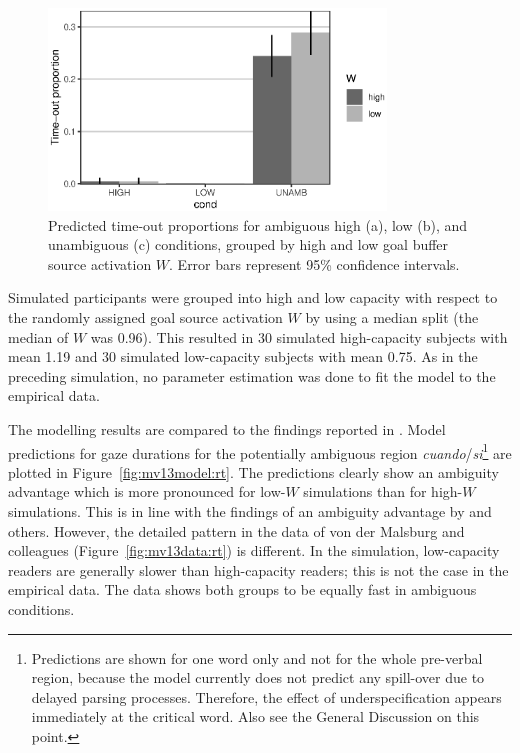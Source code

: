 \documentclass{cambridge7A}\usepackage[]{graphicx}\usepackage[]{color}
\newenvironment{knitrout}{}{} %
\begin{document}
\begin{figure}[!htbp]
  \centering
\begin{knitrout}
\color{fgcolor}

{\centering \includegraphics[width=0.8\textwidth]{figures/fig-mv13modeltimeout-1} 

}



\end{knitrout}
%
  \caption[Predicted time-out proportions by source activation at ambiguous and unambiguous attachments.]{Predicted time-out proportions for ambiguous high (a), low (b), and unambiguous (c) conditions, grouped by high and low goal buffer source activation $W$. Error bars represent 95\% confidence intervals.} \label{fig:mv13model:timeout}
\end{figure}

Simulated participants were grouped into high and low capacity with respect to the randomly assigned goal source activation $W$ by using a median split (the median of $W$ was 0.96).
This resulted in $30$ simulated high-capacity subjects with mean 1.19 and $30$ simulated low-capacity subjects with mean 0.75.
As in the preceding simulation, no parameter estimation was done to fit the model to the empirical data. 

The modelling results are compared to the findings reported in \cite{MalsburgVasishth2013}. Model predictions for gaze durations for the potentially ambiguous region \textit{cuando}/\textit{si}\footnote{Predictions are shown for one word only and not for the whole pre-verbal region, because the model currently does not predict any spill-over due to delayed parsing processes. Therefore, the effect of underspecification appears immediately at the critical word. Also see the General Discussion on this point.} 
are plotted in Figure~\ref{fig:mv13model:rt}. The predictions clearly show an ambiguity advantage which is more pronounced for low-$W$ simulations than for high-$W$ simulations. This is in line with the findings of an ambiguity advantage by \cite{MalsburgVasishth2013} and others. However, the detailed pattern in the data of von der Malsburg and colleagues (Figure~\ref{fig:mv13data:rt}) is different. In the simulation, low-capacity readers are generally slower than high-capacity readers; this is not the case in the empirical data. The data shows both groups to be equally fast in ambiguous conditions.
\end{document}
